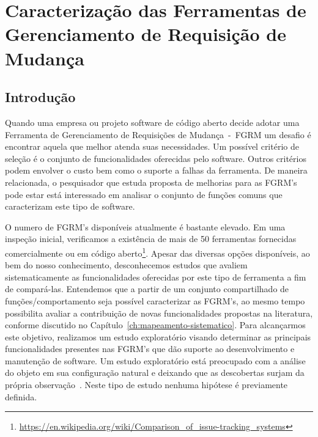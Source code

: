 \chapter{Caracterização das Ferramentas de Gerenciamento de Requisição de
	Mudança}
\label{ch:caracterizacao}


\section{Introdução}

Quando uma empresa ou projeto software de código aberto decide adotar uma
Ferramenta de Gerenciamento de Requisições de Mudança~-~FGRM um desafio é
encontrar aquela que melhor atenda suas necessidades. Um possível critério de
seleção é o conjunto de funcionalidades oferecidas pelo software. Outros
critérios podem envolver o custo bem como o suporte a falhas da ferramenta. De
maneira relacionada, o pesquisador que estuda proposta de melhorias para as
FGRM's pode estar está interessado em analisar o conjunto de funções
comuns que caracterizam este tipo de software.

O numero de FGRM's disponíveis atualmente é bastante elevado. Em uma inspeção
inicial, verificamos a existência de mais de 50 ferramentas fornecidas
comercialmente ou em código
aberto\footnote{\url{https://en.wikipedia.org/wiki/Comparison_of_issue-tracking_systems}}.
Apesar das diversas opções disponíveis, ao bem do nosso conhecimento,
desconhecemos estudos que avaliem sistematicamente as funcionalidades oferecidas
por este tipo de ferramenta a fim de compará-las. Entendemos que a partir de um
conjunto compartilhado de funções/comportamento seja possível caracterizar as
FGRM's, ao mesmo tempo possibilita avaliar a contribuição de novas
funcionalidades propostas na literatura, conforme discutido no
Capítulo~\ref{ch:mapeamento-sistematico}. Para alcançarmos este objetivo,
realizamos um estudo exploratório visando determinar as principais
funcionalidades presentes nas FGRM's que dão suporte ao desenvolvimento e
manutenção de software. Um estudo exploratório está preocupado com a análise do
objeto em sua configuração natural e deixando que as descobertas surjam da
própria observação~\cite{wohlin2012experimentation}. Neste tipo de estudo
nenhuma hipótese é previamente definida.

